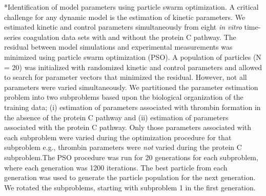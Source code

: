 \documentclass[12pt]{article}
\makeatletter
\renewcommand\subsection{\@startsection
	{subsection}{2}{0mm}
	{-0.05in}
	{-0.5\baselineskip}
	{\normalfont\normalsize\bfseries}}
\makeatother
\begin{document}
\subsection*{Identification of model parameters using particle swarm optimization.}
A critical challenge for any dynamic model is the estimation of kinetic parameters. 
We estimated kinetic and control parameters simultaneously from eight \emph{in vitro} time-series coagulation data sets with and without the protein C pathway. 
The residual between model simulations and experimental measurements was minimized using particle swarm optimization (PSO). 
A population of particles (N = 20) was initialized with randomized kinetic and control parameters and allowed to search for parameter vectors that minimized
the residual. However, not all parameters were varied simultaneously. 
We partitioned the parameter estimation problem into two subproblems based upon the biological organization of the training data; 
(i) estimation of parameters associated with thrombin formation in the absence of the protein C pathway and (ii) estimation of parameters associated with the protein C pathway.
Only those parameters associated with each subproblem were varied during the optimization procedure for that subproblem e.g., thrombin parameters were \textit{not} varied during the protein C subproblem.The PSO procedure was run for 20 generations for each subproblem, where each generation was 1200 iterations. The best particle from each generation was used to generate the particle population for the next generation. We rotated the subproblems, starting with subproblem 1 in the first generation.
\end{document}
